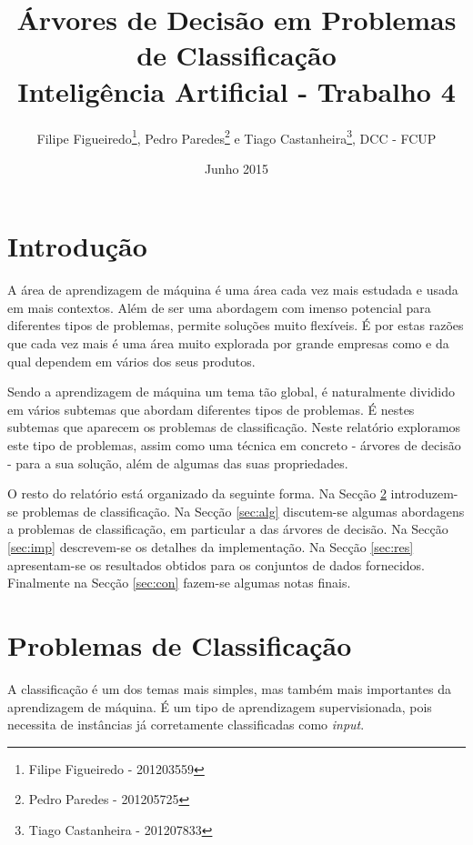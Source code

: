 \documentclass[12pt,a4paper,oneside]{article}
\title{Árvores de Decisão em Problemas de Classificação\\
  \vspace{0.1in}
  \large{Inteligência Artificial - Trabalho 4}
}
\author{Filipe Figueiredo\footnote{Filipe Figueiredo - 201203559},
  Pedro Paredes\footnote{Pedro Paredes - 201205725} e Tiago
  Castanheira\footnote{Tiago Castanheira - 201207833}, DCC - FCUP}
\date{Junho 2015}
\begin{document}
\maketitle


\section{Introdução}
\label{sec:intro}

A área de aprendizagem de máquina é uma área cada vez mais estudada e
usada em mais contextos. Além de ser uma abordagem com imenso
potencial para diferentes tipos de problemas, permite soluções muito
flexíveis. É por estas razões que cada vez mais é uma área muito
explorada por grande empresas como \cite{google:2015}
\cite{facebook:2015} e da qual dependem em vários dos seus produtos.

Sendo a aprendizagem de máquina um tema tão global, é naturalmente
dividido em vários subtemas que abordam diferentes tipos de
problemas. É nestes subtemas que aparecem os problemas de
classificação. Neste relatório exploramos este tipo de problemas,
assim como uma técnica em concreto - árvores de decisão - para a sua
solução, além de algumas das suas propriedades.

O resto do relatório está organizado da seguinte forma. Na Secção
\ref{sec:cla} introduzem-se problemas de classificação. Na Secção
\ref{sec:alg} discutem-se algumas abordagens a problemas de
classificação, em particular a das árvores de decisão. Na Secção
\ref{sec:imp} descrevem-se os detalhes da implementação. Na Secção
\ref{sec:res} apresentam-se os resultados obtidos para os conjuntos de
dados fornecidos. Finalmente na Secção \ref{sec:con} fazem-se algumas
notas finais.


\section{Problemas de Classificação}
\label{sec:cla}

A classificação é um dos temas mais simples, mas também mais
importantes da aprendizagem de máquina. É um tipo de aprendizagem
supervisionada, pois necessita de instâncias já corretamente
classificadas como \textit{input}.
\end{document}
